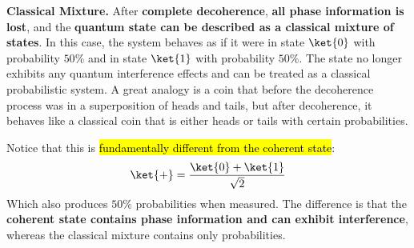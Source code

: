 \begin{itemize}
\begin{center}
    \end{center}

    \textcolor{Red2}{ \textbf{Classical Mixture.}} After \textbf{complete decoherence}, \textbf{all phase information is lost}, and the \textbf{quantum state can be described as a classical mixture of states}. In this case, the system behaves as if it were in state $\ket{0}$ with probability $50\%$ and in state $\ket{1}$ with probability $50\%$. The state no longer exhibits any quantum interference effects and can be treated as a classical probabilistic system. A great analogy is a coin that before the decoherence process was in a superposition of heads and tails, but after decoherence, it behaves like a classical coin that is either heads or tails with certain probabilities.
    \begin{center}
    \end{center}

    Notice that this is \hl{fundamentally different from the coherent state}:
    \begin{equation*}
        \ket{+}
        =
        \frac{\ket{0}+\ket{1}}{\sqrt{2}}
    \end{equation*}
    Which also produces $50\%$ probabilities when measured. The difference is that the \textbf{coherent state contains phase information and can exhibit interference}, whereas the classical mixture contains only probabilities. 
    

\end{itemize}
